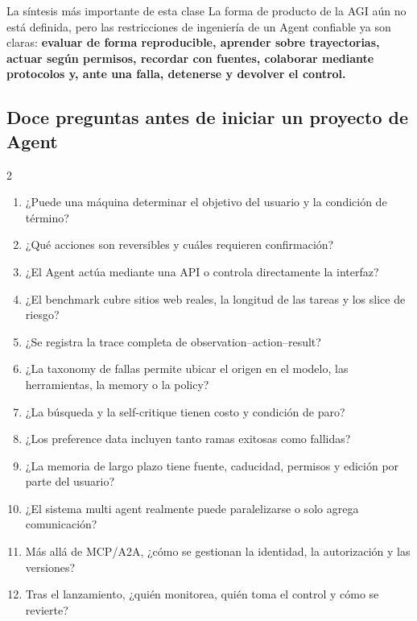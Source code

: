 \begin{importantbox}{La síntesis más importante de esta clase}
La forma de producto de la AGI aún no está definida, pero las restricciones de ingeniería de un Agent confiable ya son claras: \textbf{evaluar de forma reproducible, aprender sobre trayectorias, actuar según permisos, recordar con fuentes, colaborar mediante protocolos y, ante una falla, detenerse y devolver el control.}
\end{importantbox}

\subsection{Doce preguntas antes de iniciar un proyecto de Agent}

\begin{multicols}{2}
\small
\begin{enumerate}
  \item ¿Puede una máquina determinar el objetivo del usuario y la condición de término?
  \item ¿Qué acciones son reversibles y cuáles requieren confirmación?
  \item ¿El Agent actúa mediante una API o controla directamente la interfaz?
  \item ¿El benchmark cubre sitios web reales, la longitud de las tareas y los slice de riesgo?
  \item ¿Se registra la trace completa de observation--action--result?
  \item ¿La taxonomy de fallas permite ubicar el origen en el modelo, las herramientas, la memory o la policy?
  \item ¿La búsqueda y la self-critique tienen costo y condición de paro?
  \item ¿Los preference data incluyen tanto ramas exitosas como fallidas?
  \item ¿La memoria de largo plazo tiene fuente, caducidad, permisos y edición por parte del usuario?
  \item ¿El sistema multi agent realmente puede paralelizarse o solo agrega comunicación?
  \item Más allá de MCP/A2A, ¿cómo se gestionan la identidad, la autorización y las versiones?
  \item Tras el lanzamiento, ¿quién monitorea, quién toma el control y cómo se revierte?
\end{enumerate}
\normalsize
\end{multicols}

